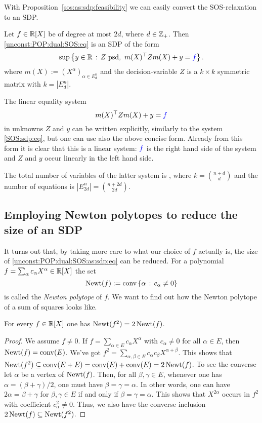 With Proposition~\ref{sos:as:sdp:feasibility} we can easily convert the SOS-relaxation to an SDP. 

\begin{corollary}
	Let $f \in \mathbb{R}[X]$ be of degree at most $2 d$, where $d \in \mathbb{Z}_+$. Then \eqref{unconst:POP:dual:SOS:eq} is an SDP of the form
	\begin{equation}
		\sup \left\{ y \in \mathbb{R} \,:\, Z \ \text{psd}, \  m(X)^\top Z m(X) + y = \textcolor{blue}{f} \right\}. \label{unconst:POP:dual:SOS:as:sdp:eq}
	\end{equation}
	where $m(X) := (X^\alpha)_{\alpha \in E^n_d}$ and the decision-variable $Z$ is a $k \times k$ symmetric matrix with $k=|E^n_d|$. 
\end{corollary}

The linear equality system 
\[
	m(X)^\top Z m(X) + y = \textcolor{blue}{f}
\]
in unknowns $Z$ and $y$ can be written explicitly, similarly to the system \eqref{SOS:sdp:eq}, but one can use also the above concise form. Already from this form it is clear that this is a linear system: $\textcolor{blue}{f}$ is the right hand side of the system and $Z$ and $y$ occur linearly in the left hand side.

The total number of variables of the latter system is , where $k = \binom{n+d}{d}$ and the number of equations is $|E_{2d}^n| = \binom{n+2d}{2d}$. 

\subsection{Employing Newton polytopes to reduce the size of an SDP} 

It turns out that, by taking more care to what our choice of $f$ actually is, the size of \eqref{unconst:POP:dual:SOS:as:sdp:eq} can be reduced. For a polynomial $f = \sum_\alpha c_\alpha X^\alpha \in \mathbb{R}[X]$ the set 
\[
	\operatorname{Newt}(f) := \operatorname{conv} \left\{  \alpha  \,:\, c_\alpha \ne 0 \right\}
\]
is called the \emph{Newton polytope} of $f$. We want to find out how the Newton polytope of a sum of squares looks like.  

\begin{lemma}
	\label{Newton:of:square}
	For every $f \in \mathbb{R}[X]$ one has $\operatorname{Newt}(f^2) = 2 \operatorname{Newt}(f)$. 
\end{lemma}
\begin{proof}
	We assume $f \ne 0$. If $f = \sum_{\alpha \in E} c_\alpha X^\alpha$ with $c_\alpha \ne 0$ for all $\alpha \in E$, then $\operatorname{Newt}(f) = \operatorname{conv}(E)$. We've got $f^2 = \sum_{\alpha, \beta \in E} c_\alpha c_\beta X^{\alpha + \beta}$. This shows that $\operatorname{Newt}(f^2) \subseteq \operatorname{conv}(E+E) = \operatorname{conv}(E)+\operatorname{conv}(E) = 2 \operatorname{Newt}(f)$. To see the converse let $\alpha$ be a vertex of $\operatorname{Newt}(f)$. Then, for all $\beta,\gamma \in E$, whenever one has $\alpha = (\beta+ \gamma)/2$, one must have $\beta=\gamma=\alpha$. In other words, one can have $2 \alpha = \beta + \gamma$ for $\beta,\gamma \in E$ if and only if $\beta=\gamma=\alpha$. This shows that $X^{2\alpha}$ occurs in $f^2$ with coefficient $c_\alpha^2 \ne 0$. Thus, we also have the converse inclusion $2 \operatorname{Newt}(f) \subseteq \operatorname{Newt}(f^2)$. 
\end{proof}

